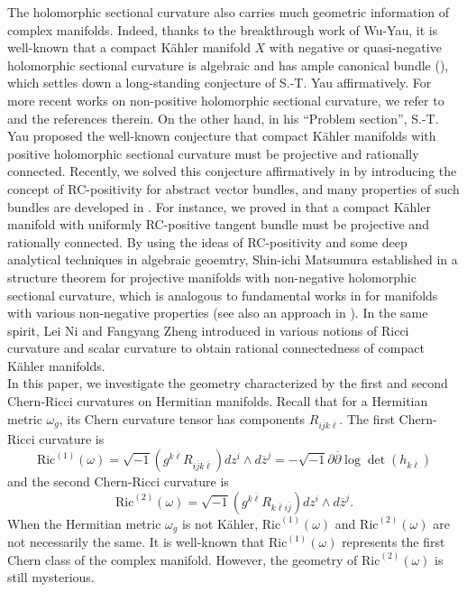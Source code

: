 \documentclass[11pt]{amsart}
\newcommand\bp{{\bar\partial}}
\theoremstyle{plain}
\theoremstyle{definition}
\newcommand{\sq}{\sqrt{-1}}
\newcommand{\p}{\partial}
\renewcommand{\bar}{\overline}
\renewcommand{\bp}{\bar{\partial}}
\renewcommand{\>}{\rightarrow}
\numberwithin{equation}{section} %
\begin{document}
	    The  holomorphic sectional curvature also carries much geometric information of   complex manifolds. Indeed, thanks to the breakthrough work \cite{WuYau2016} of Wu-Yau, it is well-known that  a compact K\"ahler manifold $X$ with negative or quasi-negative holomorphic sectional curvature is algebraic and has ample canonical bundle (\cite{TosattiYang2017,WuYau2016a,Diverio2019}), which settles down a long-standing conjecture of S.-T. Yau affirmatively. For more recent works on  non-positive holomorphic sectional curvature, we refer to \cite{Wong1981,Heier2010,Heier2016,Heier2018,Nomura2018,Guenancia2018,YangZheng2019TAMS,WuYau2020} and the references therein. On the other hand, in his “Problem section”,
	    S.-T. Yau proposed the well-known conjecture \cite[Problem~47]{Yau1982} that compact K\"ahler manifolds with positive holomorphic sectional curvature must be projective and rationally connected. Recently, we solved this conjecture affirmatively in \cite{Yang2018} by introducing the concept of RC-positivity for abstract vector bundles, and many properties of such bundles are developed in \cite{Yang2018, Yang2018a,Yang2018b,Yang2021}. For instance, we proved in \cite{Yang2018b}  that a compact K\"ahler manifold with uniformly RC-positive tangent bundle must be projective and rationally connected.  By using the ideas of RC-positivity and some deep analytical techniques in algebraic geoemtry, Shin-ichi Matsumura established in \cite{Matsumura2018a,Matsumura2018b,Matsumura2018} a structure theorem for projective manifolds  with non-negative holomorphic sectional curvature, which is analogous to fundamental works in \cite{Mok1988, Campana2015a,Cao2017a,Cao2019} for manifolds with various non-negative properties (see also an approach in \cite{HeierWong2015}). In the same spirit, Lei Ni and Fangyang Zheng introduced in \cite{Ni2018,NiZheng2018a} various notions of Ricci curvature and scalar curvature to obtain rational connectedness of compact K\"ahler manifolds.\\
	
	
	
	In this paper, we investigate the geometry characterized by the first and second Chern-Ricci curvatures on Hermitian manifolds. Recall that for a Hermitian metric $\omega_g$,  its Chern curvature tensor has components $R_{i\bar j k\bar\ell}$. The first Chern-Ricci curvature is $$\mathrm{Ric}^{(1)}(\omega)=\sq \left(g^{k\bar\ell}R_{i\bar j k\bar \ell}\right)dz^i\wedge d\bar z^j=-\sq \p\bp\log\det(h_{k\bar\ell}) $$
	and the second Chern-Ricci curvature is 
	$$\mathrm{Ric}^{(2)}(\omega)=\sq \left(g^{k\bar\ell}R_{ k\bar \ell i\bar j}\right)dz^i\wedge d\bar z^j.$$
	When the Hermitian metric $\omega_g$ is not K\"ahler,  $\mathrm{Ric}^{(1)}(\omega)$ and $\mathrm{Ric}^{(2)}(\omega)$ are not necessarily the same. It is well-known that $\mathrm{Ric}^{(1)}(\omega)$ represents the first Chern class of the complex manifold. However, the geometry of $\mathrm{Ric}^{(2)}(\omega)$ is still mysterious.\\
	
\end{document}
